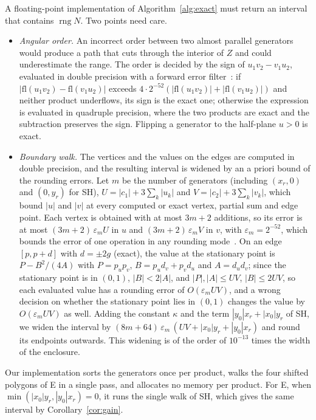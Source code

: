 \documentclass[10pt]{article}
\theoremstyle{definition}
\newcommand{\eps}{\varepsilon}
\newcommand{\rng}{\operatorname{rng}}
\begin{document}
A floating-point implementation of Algorithm~\ref{alg:exact} must return an interval that contains $\rng N$. Two points need care.
\begin{itemize}
\item \emph{Angular order.} An incorrect order between two almost parallel generators would produce a path that cuts through the interior of $Z$ and could underestimate the range. The order is decided by the sign of $u_1v_2-v_1u_2$, evaluated in double precision with a forward error filter~\cite{shewchuk1997adaptive}: if $|\mathrm{fl}(u_1v_2)-\mathrm{fl}(v_1u_2)|$ exceeds $4\cdot2^{-52}(|\mathrm{fl}(u_1v_2)|+|\mathrm{fl}(v_1u_2)|)$ and neither product underflows, its sign is the exact one; otherwise the expression is evaluated in quadruple precision, where the two products are exact and the subtraction preserves the sign. Flipping a generator to the half-plane $u>0$ is exact.
\item \emph{Boundary walk.} The vertices and the values on the edges are computed in double precision, and the resulting interval is widened by an a priori bound of the rounding errors. Let $m$ be the number of generators (including $(x_r,0)$ and $(0,y_r)$ for SH), $U=|c_1|+3\sum_k|u_k|$ and $V=|c_2|+3\sum_k|v_k|$, which bound $|u|$ and $|v|$ at every computed or exact vertex, partial sum and edge point. Each vertex is obtained with at most $3m+2$ additions, so its error is at most $(3m+2)\,\eps_m U$ in $u$ and $(3m+2)\,\eps_m V$ in $v$, with $\eps_m=2^{-52}$, which bounds the error of one operation in any rounding mode~\cite{higham2002accuracy}. On an edge $[p,p+d]$ with $d=\pm2g$ (exact), the value at the stationary point is $P-B^2/(4A)$ with $P=p_up_v$, $B=p_ud_v+p_vd_u$ and $A=d_ud_v$; since the stationary point is in $(0,1)$, $|B|<2|A|$, and $|P|,|A|\le UV$, $|B|\le2UV$, so each evaluated value has a rounding error of $O(\eps_m UV)$, and a wrong decision on whether the stationary point lies in $(0,1)$ changes the value by $O(\eps_m UV)$ as well. Adding the constant $\kappa$ and the term $|y_0|x_r+|x_0|y_r$ of SH, we widen the interval by $(8m+64)\,\eps_m\,(UV+|x_0|y_r+|y_0|x_r)$ and round its endpoints outwards. This widening is of the order of $10^{-13}$ times the width of the enclosure.
\end{itemize}
Our implementation sorts the generators once per product, walks the four shifted polygons of E in a single pass, and allocates no memory per product. For E, when $\min(|x_0|y_r,|y_0|x_r)=0$, it runs the single walk of SH, which gives the same interval by Corollary~\ref{cor:gain}.
\end{document}
